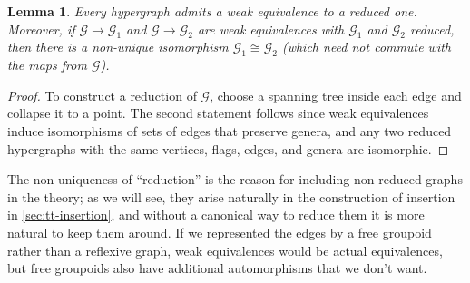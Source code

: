 \documentclass{article}
\newtheorem{lem}[thm]{Lemma}
\theoremstyle{definition}
\newtheorem{defn}[thm]{Definition}
\theoremstyle{remark}
\def\G{\mathcal{G}}
\begin{document}
\begin{lem}
  Every hypergraph admits a weak equivalence to a reduced one.
  Moreover, if $\G\to \G_1$ and $\G \to \G_2$ are weak equivalences with $\G_1$ and $\G_2$ reduced, then there is a non-unique isomorphism $\G_1 \cong \G_2$ (which need not commute with the maps from $\G$).
\end{lem}
\begin{proof}
  To construct a reduction of $\G$, choose a spanning tree inside each edge and collapse it to a point.
  The second statement follows since weak equivalences induce isomorphisms of sets of edges that preserve genera, and any two reduced hypergraphs with the same vertices, flags, edges, and genera are isomorphic.
\end{proof}

The non-uniqueness of ``reduction'' is the reason for including non-reduced graphs in the theory; as we will see, they arise naturally in the construction of insertion in \cref{sec:tt-insertion}, and without a canonical way to reduce them it is more natural to keep them around.
If we represented the edges by a free groupoid rather than a reflexive graph, weak equivalences would be actual equivalences, but free groupoids also have additional automorphisms that we don't want.


\end{document}
